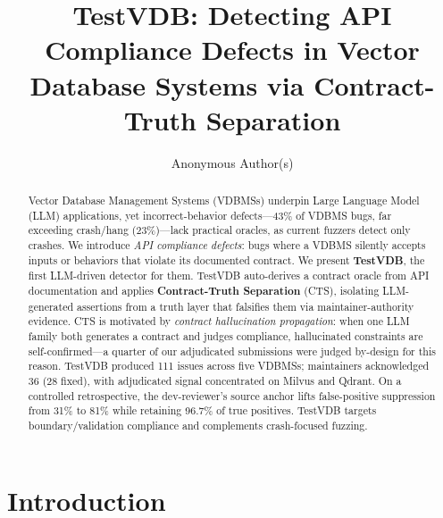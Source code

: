 \documentclass[sigconf]{acmart}
\begin{document}
\title{TestVDB: Detecting API Compliance Defects in Vector Database Systems via Contract-Truth Separation}

\author{Anonymous Author(s)}



\begin{abstract}
Vector Database Management Systems (VDBMSs) underpin Large Language Model (LLM) applications, yet incorrect-behavior defects---43\% of VDBMS bugs, far exceeding crash/hang (23\%)---lack practical oracles, as current fuzzers detect only crashes. We introduce \emph{API compliance defects}: bugs where a VDBMS silently accepts inputs or behaviors that violate its documented contract. We present \textbf{TestVDB}, the first LLM-driven detector for them. TestVDB auto-derives a contract oracle from API documentation and applies \textbf{Contract-Truth Separation} (CTS), isolating LLM-generated assertions from a truth layer that falsifies them via maintainer-authority evidence. CTS is motivated by \emph{contract hallucination propagation}: when one LLM family both generates a contract and judges compliance, hallucinated constraints are self-confirmed---a quarter of our adjudicated submissions were judged by-design for this reason. TestVDB produced 111 issues across five VDBMSs; maintainers acknowledged 36 (28 fixed), with adjudicated signal concentrated on Milvus and Qdrant. On a controlled retrospective, the dev-reviewer's source anchor lifts false-positive suppression from 31\% to 81\% while retaining 96.7\% of true positives. TestVDB targets boundary/validation compliance and complements crash-focused fuzzing.
\end{abstract}

\maketitle

\section{Introduction}\label{sec:intro}
\end{document}
